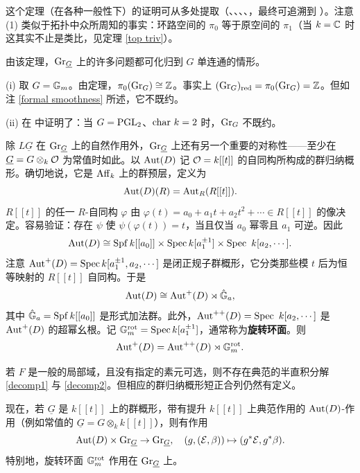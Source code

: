 这个定理（在各种一般性下）的证明可从多处提取（\cite[\S 4.5]{BD}、\cite{BL}、\cite{LS}、\cite{BLS}、\cite{Fa}，最终可追溯到 \cite{PR}）。注意 (1) 类似于拓扑中众所周知的事实：环路空间的 $\pi_0$ 等于原空间的 $\pi_1$（当 $k={\mathbb C}$ 时这其实不止是类比，见定理 \ref{top triv}）。

由该定理，${\operatorname{Gr}}_{\underline G}$ 上的许多问题都可化归到 $G$ 单连通的情形。

\begin{ex}
(i) 取 $G={\mathbb G}_m$。由定理，$\pi_0({\operatorname{Gr}}_G)\cong {\mathbb Z}$。事实上 $({\operatorname{Gr}}_G)_{\operatorname{red}}=\pi_0({\operatorname{Gr}}_G)={\mathbb Z}$。但如注 \ref{formal smoothness} 所述，它不既约。

(ii) 在 \cite[Remark 6.4]{PR} 中证明了：当 $G=\operatorname{PGL}_2$、${\operatorname{char}}\ k=2$ 时，${\operatorname{Gr}}_G$ 不既约。
\end{ex}

除 $L\underline G$ 在 ${\operatorname{Gr}}_{\underline G}$ 上的自然作用外，${\operatorname{Gr}}_{\underline G}$ 上还有另一个重要的对称性——至少在 $\underline G=G\otimes_k{\mathcal O}$ 为常值时如此。以 ${\operatorname{Aut}}(D)$ 记 ${\mathcal O}=k[[t]]$ 的自同构所构成的群归纳概形。确切地说，它是 ${\operatorname{Aff}}_k$ 上的群预层，定义为
\[
{\operatorname{Aut}}(D)(R)={\operatorname{Aut}}_R(R[[t]]).
\]
$R[[t]]$ 的任一 $R$-自同构 $\varphi$ 由 $\varphi(t)=a_0+a_1t+a_2t^2+\cdots\in R[[t]]$ 的像决定。容易验证：存在 $\psi$ 使 $\psi(\varphi(t))=t$，当且仅当 $a_0$ 幂零且 $a_1$ 可逆。因此
\[
{\operatorname{Aut}}(D)\cong \operatorname{Spf} k[[a_0]] \times \operatorname{Spec} k[a_1^{\pm 1}]\times \operatorname{Spec}\ k[a_2,\cdots].
\]
注意 ${\operatorname{Aut}}^+(D)=\operatorname{Spec} k[a_1^{\pm 1},a_2,\cdots]$ 是闭正规子群概形，它分类那些模 $t$ 后为恒等映射的 $R[[t]]$ 自同构。于是
\begin{equation}\label{decomp1}
{\operatorname{Aut}}(D)\cong {\operatorname{Aut}}^+(D)\rtimes \hat{{\mathbb G}}_a,
\end{equation}
其中 $\hat{{\mathbb G}}_a=\operatorname{Spf} k[[a_0]]$ 是形式加法群。此外，$\Aut^{++}(D)=\Spec\ k[a_2,\cdots]$ 是 ${\operatorname{Aut}}^+(D)$ 的超幂幺根。记 ${\mathbb G}_m^{\operatorname{rot}}=\operatorname{Spec} k[a_1^{\pm 1}]$，通常称为\textbf{旋转环面}。则
\begin{equation}\label{decomp2}
{\operatorname{Aut}}^+(D)={\operatorname{Aut}}^{++}(D)\rtimes {\mathbb G}_m^{\operatorname{rot}}.
\end{equation}

\begin{rmk}
若 $F$ 是一般的局部域，且没有指定的素元可选，则不存在典范的半直积分解 \eqref{decomp1} 与 \eqref{decomp2}。但相应的群归纳概形短正合列仍然有定义。
\end{rmk}

现在，若 $\underline G$ 是 $k[[t]]$ 上的群概形，带有提升 $k[[t]]$ 上典范作用的 ${\operatorname{Aut}}(D)$-作用（例如常值的 $\underline G=G\otimes_k k[[t]]$），则有作用
\begin{equation}\label{auto of disc}
{\operatorname{Aut}}(D)\times {\operatorname{Gr}}_{\underline G}\to {\operatorname{Gr}}_{\underline G},\quad (g, ({\mathcal E},\beta))\mapsto (g^*{\mathcal E},g^*\beta).
\end{equation}
特别地，旋转环面 ${\mathbb G}_m^{\operatorname{rot}}$ 作用在 ${\operatorname{Gr}}_{\underline G}$ 上。
